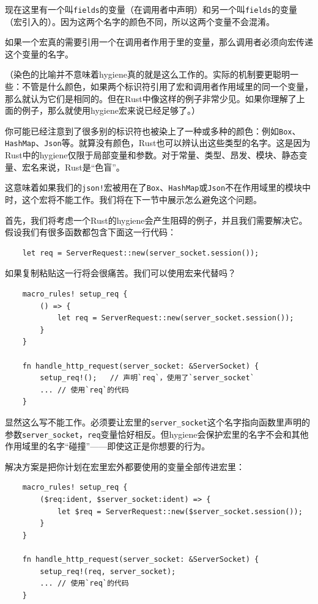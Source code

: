 现在这里有一个叫\texttt{fields}的变量（在调用者中声明）和另一个叫\texttt{fields}的变量（宏引入的）。因为这两个名字的颜色不同，所以这两个变量不会混淆。

如果一个宏真的需要引用一个在调用者作用于里的变量，那么调用者必须向宏传递这个变量的名字。

（染色的比喻并不意味着hygiene真的就是这么工作的。实际的机制要更聪明一些：不管是什么颜色，如果两个标识符引用了宏和调用者作用域里的同一个变量，那么就认为它们是相同的。但在Rust中像这样的例子非常少见。如果你理解了上面的例子，那么就使用hygiene宏来说已经足够了。）

你可能已经注意到了很多别的标识符也被染上了一种或多种的颜色：例如\texttt{Box}、\texttt{HashMap}、\texttt{Json}等。就算没有颜色，Rust也可以辨认出这些类型的名字。这是因为Rust中的hygiene仅限于局部变量和参数。对于常量、类型、昂发、模块、静态变量、宏名来说，Rust是“色盲”。

这意味着如果我们的\texttt{json!}宏被用在了\texttt{Box}、\texttt{HashMap}或\texttt{Json}不在作用域里的模块中时，这个宏将不能工作。我们将在下一节中展示怎么避免这个问题。

首先，我们将考虑一个Rust的hygiene会产生阻碍的例子，并且我们需要解决它。假设我们有很多函数都包含下面这一行代码：
\begin{verbatim}
    let req = ServerRequest::new(server_socket.session());
\end{verbatim}

如果复制粘贴这一行将会很痛苦。我们可以使用宏来代替吗？
\begin{verbatim}
    macro_rules! setup_req {
        () => {
            let req = ServerRequest::new(server_socket.session());
        }
    }

    fn handle_http_request(server_socket: &ServerSocket) {
        setup_req!();   // 声明`req`，使用了`server_socket`
        ... // 使用`req`的代码
    }
\end{verbatim}

显然这么写不能工作。必须要让宏里的\texttt{server\_socket}这个名字指向函数里声明的参数\texttt{server\_socket}，\texttt{req}变量恰好相反。但hygiene会保护宏里的名字不会和其他作用域里的名字“碰撞”——即使这正是你想要的行为。

解决方案是把你计划在宏里宏外都要使用的变量全部传进宏里：
\begin{verbatim}
    macro_rules! setup_req {
        ($req:ident, $server_socket:ident) => {
            let $req = ServerRequest::new($server_socket.session());
        }
    }

    fn handle_http_request(server_socket: &ServerSocket) {
        setup_req!(req, server_socket);
        ... // 使用`req`的代码
    }
\end{verbatim}

